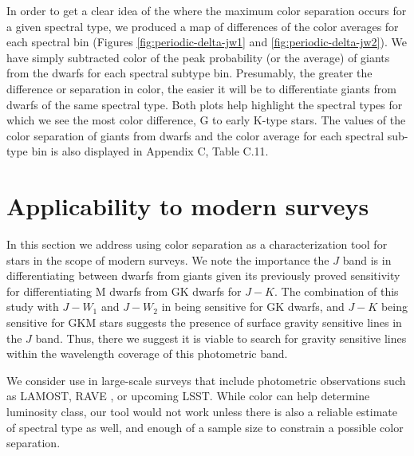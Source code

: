 In order to get a clear idea of the where the maximum color separation occurs for a given spectral type, we produced a map of differences of the color averages for each spectral bin (Figures \ref{fig:periodic-delta-jw1} and \ref{fig:periodic-delta-jw2}). We have simply subtracted color of the peak probability (or the average) of giants from the dwarfs for each spectral subtype bin. Presumably, the greater the difference or separation in color, the easier it will be to differentiate giants from dwarfs of the same spectral type. Both plots help highlight the spectral types for which we see the most color difference, G to early K-type stars. The values of the color separation of giants from dwarfs and the color average for each spectral sub-type bin is also displayed in Appendix C, Table C.11.

\section{Applicability to modern surveys}
In this section we address using color separation as a characterization tool for stars in the scope of modern surveys. We note the importance the $J$ band is in differentiating between dwarfs from giants given its previously proved sensitivity for differentiating M dwarfs from GK dwarfs for $J-K$. The combination of this study with $J-W_{1}$ and $J-W_{2}$ in being sensitive for GK dwarfs, and $J-K$ being sensitive for GKM stars suggests the presence of surface gravity sensitive lines in the $J$ band. Thus, there we suggest it is viable to search for gravity sensitive lines within the wavelength coverage of this photometric band. 


We consider use in large-scale  surveys that include photometric observations such as LAMOST, RAVE , or upcoming LSST. While color can help determine luminosity class, our tool would not work unless there is also a reliable estimate of spectral type as well, and enough of a sample size to constrain a possible color separation.

